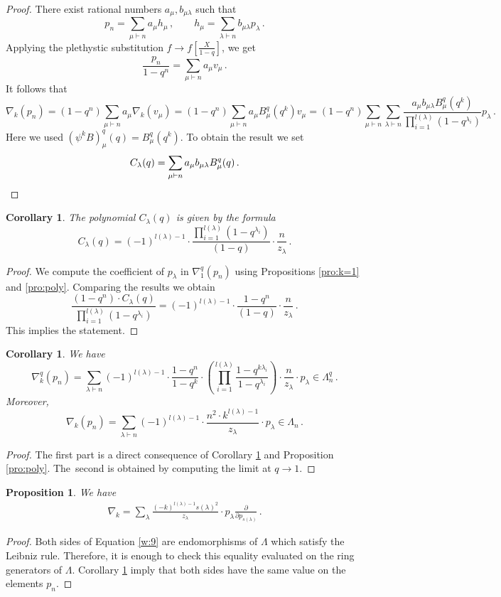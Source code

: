 \documentclass[12pt,a4paper]{amsart}
\theoremstyle{plain}
\newtheorem{pro}[tw]{Proposition}
\newtheorem{cor}[tw]{Corollary}
\theoremstyle{definition}
\theoremstyle{remark}
\newcommand\znak[1]{(-1)^{l({#1})-1}}
\begin{document}
\begin{proof}
	There exist rational numbers $a_{\mu}, b_{\mu\lambda}$ such that
	$$p_n=\sum_{\mu\vdash n}a_{\mu}h_{\mu}\,, \qquad h_{\mu}=\sum_{\lambda\vdash n}b_{\mu\lambda}p_{\lambda}\,. $$
	Applying the plethystic substitution $f\to f[\frac{X}{1-q}]$, we get
	$$\frac{p_n}{1-q^n}=\sum_{\mu\vdash n}a_{\mu}v_{\mu}\,.$$
	It follows that
	$$\nabla_k(p_n)=
	(1-q^n)\sum_{\mu\vdash n}a_{\mu}\nabla_k(v_{\mu})=
	(1-q^n)\sum_{\mu\vdash n}a_{\mu}B^q_{\mu}(q^k) v_{\mu}=
	(1-q^n)\sum_{\mu\vdash n}\sum_{\lambda\vdash n}\frac{a_{\mu}b_{\mu\lambda}B^q_{\mu}(q^k)}{\prod_{i=1}^{l(\lambda)}(1-q^{\lambda_i})} p_\lambda
	\,.
	$$
	Here we used $(\psi^kB)^q_{\mu}(q)=B^q_{\mu}(q^k)$. To obtain the result we set
	\[C_\lambda(q)=\sum_{\mu\vdash n}a_{\mu}b_{\mu\lambda}B^q_{\mu}(q)\,.  \qedhere \] 
\end{proof}
\begin{cor} \label{cor:C}
The polynomial $C_\lambda(q)$ is given by the formula
	$$C_\lambda(q)
	=\znak{\lambda}\cdot \frac{\prod_{i=1}^{l(\lambda)}(1-q^{\lambda_i})}{(1-q)}\cdot \frac{n}{z_\lambda}\,.$$
\end{cor}
\begin{proof}
	We compute the coefficient of $p_{\lambda}$ in $\nabla^q_{1}(p_n)$ using Propositions \ref{pro:k=1} and \ref{pro:poly}. Comparing the results we obtain
	$$	
	\frac{(1-q^n)\cdot C_\lambda(q)}{\prod_{i=1}^{l(\lambda)}(1-q^{\lambda_i})}
	=\znak{\lambda}\cdot\frac{1-q^n}{(1-q)}\cdot \frac{n}{z_\lambda}\,.
	$$
	This implies the statement. 
\end{proof}
\begin{cor}\label{cor:pn}
	We have
	$$\nabla^q_k(p_n)=
	\sum_{\lambda\vdash n}\znak{\lambda}\cdot\frac{1-q^{n}}{1-q^{k}}\cdot \left(\prod_{i=1}^{l(\lambda)}\frac{1-q^{k\lambda_i}}{1-q^{\lambda_i}}\right)\cdot \frac{n}{z_\lambda}\cdot p_{\lambda}\in \Lambda^q_n\,.$$
	Moreover,
	$$\nabla_k(p_n)=\sum_{\lambda\vdash n}\znak{\lambda}\cdot \frac{n^2\cdot k^{l(\lambda)-1}}{z_\lambda}\cdot p_{\lambda} \in \Lambda_n\,.$$
\end{cor}
\begin{proof}
	The first part is a direct consequence of Corollary \ref{cor:C} and Proposition \ref{pro:poly}. The~second is obtained by computing the limit at $q\to1$.
\end{proof}
\begin{pro}\label{pro:nabla}
	We have
	\begin{align} \label{w:9}
		\nabla_k=\sum_{\lambda}\frac{(-k)^{l(\lambda)-1}s(\lambda)^2}{z_\lambda} \cdot p_{\lambda} \frac{\partial}{\partial p_{s(\lambda)}}\,.
	\end{align}
\end{pro}
\begin{proof}
	Both sides of Equation \eqref{w:9} are endomorphisms of $\Lambda$ which satisfy the Leibniz rule.  Therefore, it is enough to check this equality evaluated on the ring generators of $\Lambda$. Corollary \ref{cor:pn} imply that both sides have the same value on the elements $p_n$.
\end{proof}
\end{document}

